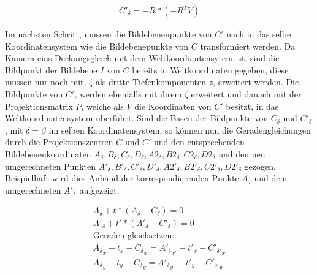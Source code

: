 \begin{gather}
	C'_\delta = - R* (-R^TV)
\end{gather}

Im nächsten Schritt, müssen die Bildebenenpunkte von $C'$ noch in das selbe Koordinatensystem wie die Bildebenepunkte von $C$ transformiert werden. Da Kamera eins Deckungsgleich mit dem Weltkoordiantensytem ist, sind die Bildpunkt der Bildebene $I$ von $C$ bereits in Weltkoordinaten gegeben, diese müssen nur noch mit, $\zeta$ als dritte Tiefenkomponenten $z$, erweitert werden. Die Bildpunkte von $C'$, werden ebenfalls mit ihrem $\zeta$ erweitert und danach mit der Projektionsmatrix $P$, welche als $V$ die Koordinaten von $C'$ besitzt, in das Weltkoordinatensystem überführt. 
Sind die Basen der Bildpunkte von $C_\delta$ und $C'_\delta$, mit $\delta = \beta$ im selben Koordinatensystem, so können nun die Geradengleichungen durch die Projektionszentren $C$ und $C'$ und den entsprechenden Bildebenenkoordinaten $A_\delta,B_\delta,C_\delta,D_\delta,A2_\delta,B2_\delta,C2_\delta,D2_\delta$ und den neu umgerechneten Punkten $A'_\delta,B'_\delta,C'_\delta,D'_\delta,A2'_\delta,B2'_\delta,C2'_\delta,D2'_\delta$ gezogen. Beispielhaft wird dies Anhand der korrespondierenden Punkte $A_\tau$ und dem umgerechneten $A'\tau$ aufgezeigt.

 
\begin{gather*}
	A_\delta + t*(A_\delta - C_\delta) = 0\\
	A'_\delta + t'*(A'_\delta - C'_\delta) = 0\\
	\text{Geraden gleichsetzen:}\\
	{A_\delta}_x - t_x-{C_\delta}_x = 	{A'_\delta}_{x'} - t'_x-{C'_{\delta'}}_x \\
	{A_\delta}_y - t_y-{C_\delta}_y = 	{A'_\delta}_{y'} - t'_y-{C'_{\delta'}}_y 
\end{gather*}

